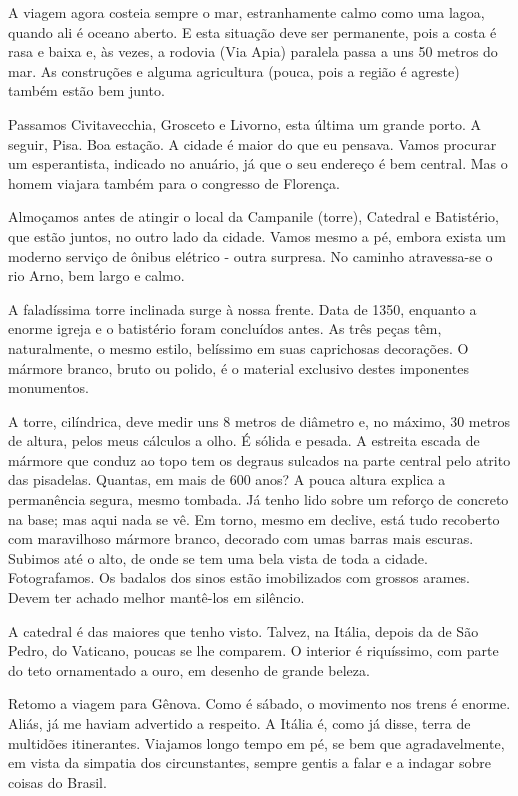 A viagem agora costeia sempre o mar, estranhamente calmo como uma lagoa, quando ali é oceano aberto. E esta situação deve ser permanente, pois a costa é rasa e baixa e, às vezes, a rodovia (Via Apia) paralela passa a uns 50 metros do mar. As construções e alguma agricultura (pouca, pois a região é agreste) também estão bem junto.

Passamos Civitavecchia, Grosceto e Livorno, esta última um grande porto. A seguir, Pisa. Boa estação. A cidade é maior do que eu pensava. Vamos procurar um esperantista, indicado no anuário, já que o seu endereço é bem central. Mas o homem viajara também para o congresso de Florença.

Almoçamos antes de atingir o local da Campanile (torre), Catedral e Batistério, que estão juntos, no outro lado da cidade. Vamos mesmo a pé, embora exista um moderno serviço de ônibus elétrico - outra surpresa. No caminho atravessa-se o rio Arno, bem largo e calmo.

A faladíssima torre inclinada surge à nossa frente. Data de 1350, enquanto a enorme igreja e o batistério foram concluídos antes. As três peças têm, naturalmente, o mesmo estilo, belíssimo em suas caprichosas decorações. O mármore branco, bruto ou polido, é o material exclusivo destes imponentes monumentos.

A torre, cilíndrica, deve medir uns 8 metros de diâmetro e, no máximo, 30 metros de altura, pelos meus cálculos a olho. É sólida e pesada. A estreita escada de mármore que conduz ao topo tem os degraus sulcados na parte central pelo atrito das pisadelas. Quantas, em mais de 600 anos? A pouca altura explica a permanência segura, mesmo tombada. Já tenho lido sobre um reforço de concreto na base; mas aqui nada se vê. Em torno, mesmo em declive, está tudo recoberto com maravilhoso mármore branco, decorado com umas barras mais escuras. Subimos até o alto, de onde se tem uma bela vista de toda a cidade. Fotografamos. Os badalos dos sinos estão imobilizados com grossos arames. Devem ter achado melhor mantê-los em silêncio.

A catedral é das maiores que tenho visto. Talvez, na Itália, depois da de São Pedro, do Vaticano, poucas se lhe comparem. O interior é riquíssimo, com parte do teto ornamentado a ouro, em desenho de grande beleza.

Retomo a viagem para Gênova. Como é sábado, o movimento nos trens é enorme. Aliás, já me haviam advertido a respeito. A Itália é, como já disse, terra de multidões itinerantes. Viajamos longo tempo em pé, se bem que agradavelmente, em vista da simpatia dos circunstantes, sempre gentis a falar e a indagar sobre coisas do Brasil.

